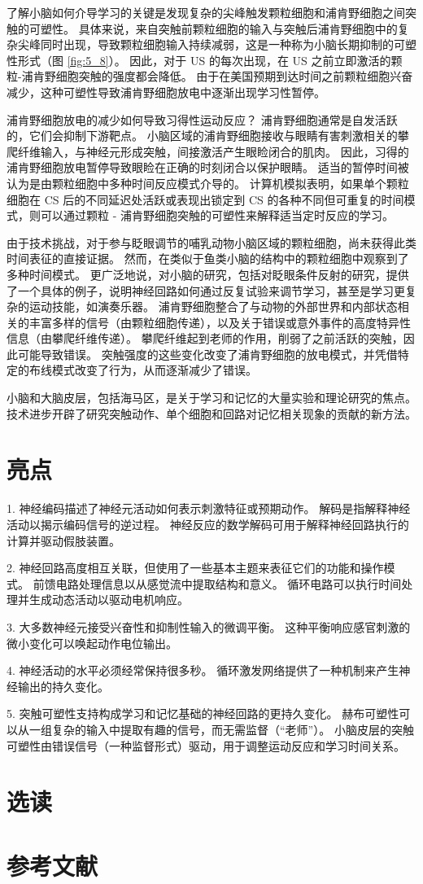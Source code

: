 了解小脑如何介导学习的关键是发现复杂的尖峰触发颗粒细胞和浦肯野细胞之间突触的可塑性。 
具体来说，来自突触前颗粒细胞的输入与突触后浦肯野细胞中的复杂尖峰同时出现，导致颗粒细胞输入持续减弱，这是一种称为小脑长期抑制的可塑性形式（图 \ref{fig:5_8}）。 
因此，对于 US 的每次出现，在 US 之前立即激活的颗粒-浦肯野细胞突触的强度都会降低。 
由于在美国预期到达时间之前颗粒细胞兴奋减少，这种可塑性导致浦肯野细胞放电中逐渐出现学习性暂停。


浦肯野细胞放电的减少如何导致习得性运动反应？ 
浦肯野细胞通常是自发活跃的，它们会抑制下游靶点。 
小脑区域的浦肯野细胞接收与眼睛有害刺激相关的攀爬纤维输入，与神经元形成突触，间接激活产生眼睑闭合的肌肉。 
因此，习得的浦肯野细胞放电暂停导致眼睑在正确的时刻闭合以保护眼睛。 
适当的暂停时间被认为是由颗粒细胞中多种时间反应模式介导的。 
计算机模拟表明，如果单个颗粒细胞在 CS 后的不同延迟处活跃或表现出锁定到 CS 的各种不同但可重复的时间模式，则可以通过颗粒 - 浦肯野细胞突触的可塑性来解释适当定时反应的学习。


由于技术挑战，对于参与眨眼调节的哺乳动物小脑区域的颗粒细胞，尚未获得此类时间表征的直接证据。 
然而，在类似于鱼类小脑的结构中的颗粒细胞中观察到了多种时间模式。 
更广泛地说，对小脑的研究，包括对眨眼条件反射的研究，提供了一个具体的例子，说明神经回路如何通过反复试验来调节学习，甚至是学习更复杂的运动技能，如演奏乐器。 
浦肯野细胞整合了与动物的外部世界和内部状态相关的丰富多样的信号（由颗粒细胞传递），以及关于错误或意外事件的高度特异性信息（由攀爬纤维传递）。 
攀爬纤维起到老师的作用，削弱了之前活跃的突触，因此可能导致错误。 
突触强度的这些变化改变了浦肯野细胞的放电模式，并凭借特定的布线模式改变了行为，从而逐渐减少了错误。


小脑和大脑皮层，包括海马区，是关于学习和记忆的大量实验和理论研究的焦点。 
技术进步开辟了研究突触动作、单个细胞和回路对记忆相关现象的贡献的新方法。


\section{亮点}
1. 神经编码描述了神经元活动如何表示刺激特征或预期动作。 
解码是指解释神经活动以揭示编码信号的逆过程。 
神经反应的数学解码可用于解释神经回路执行的计算并驱动假肢装置。 


2. 神经回路高度相互关联，但使用了一些基本主题来表征它们的功能和操作模式。 
前馈电路处理信息以从感觉流中提取结构和意义。 
循环电路可以执行时间处理并生成动态活动以驱动电机响应。 


3. 大多数神经元接受兴奋性和抑制性输入的微调平衡。 
这种平衡响应感官刺激的微小变化可以唤起动作电位输出。 


4. 神经活动的水平必须经常保持很多秒。 
循环激发网络提供了一种机制来产生神经输出的持久变化。 


5. 突触可塑性支持构成学习和记忆基础的神经回路的更持久变化。 
赫布可塑性可以从一组复杂的输入中提取有趣的信号，而无需监督（“老师”）。 
小脑皮层的突触可塑性由错误信号（一种监督形式）驱动，用于调整运动反应和学习时间关系。


\section{选读}
\section{参考文献}

